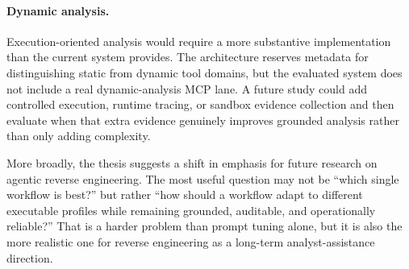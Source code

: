 \paragraph{Dynamic analysis.} Execution-oriented analysis would require a more substantive implementation than the current system provides. The architecture reserves metadata for distinguishing static from dynamic tool domains, but the evaluated system does not include a real dynamic-analysis MCP lane. A future study could add controlled execution, runtime tracing, or sandbox evidence collection and then evaluate when that extra evidence genuinely improves grounded analysis rather than only adding complexity.

More broadly, the thesis suggests a shift in emphasis for future research on agentic reverse engineering. The most useful question may not be ``which single workflow is best?'' but rather ``how should a workflow adapt to different executable profiles while remaining grounded, auditable, and operationally reliable?'' That is a harder problem than prompt tuning alone, but it is also the more realistic one for reverse engineering as a long-term analyst-assistance direction.
